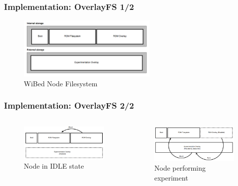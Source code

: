 \documentclass[usepdftitle=false,13pt]{beamer}
\begin{document}
\begin{frame}\frametitle{Implementation: OverlayFS 1/2}

\begin{figure}[h!]
\begin{center}
\includegraphics[width=0.6\textwidth]{pic/firmfs1}
\caption{WiBed Node Filesystem}
\label{fig:wmn}
\end{center}
\end{figure}

\end{frame}

\begin{frame}\frametitle{Implementation: OverlayFS 2/2}


\begin{columns}[c] %
		\begin{figure}[h!]
		\begin{center}
		\includegraphics[width=1.0\textwidth]{pic/firmfs2}
		\caption{Node in IDLE state}
		\label{fig:wmn}
		\end{center}
		\end{figure}
  		\begin{figure}[h!]
		\begin{center}
		\includegraphics[width=1.0\textwidth]{pic/firmfs3}
		\caption{Node performing experiment}
		\label{fig:wmn}
		\end{center}
		\end{figure}  
   	\end{columns}

\end{frame}
\end{document}
